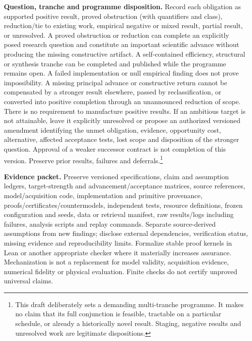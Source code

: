 \documentclass[11pt,letterpaper]{article}
\begin{document}
\textbf{Question, tranche and programme disposition.} Record each obligation as supported positive result, proved obstruction (with quantifiers and class), reduction/tie to existing work, empirical negative or mixed result, partial result, or unresolved. A proved obstruction or reduction can complete an explicitly posed research question and constitute an important scientific advance without producing the missing constructive artifact. A self-contained efficiency, structural or synthesis tranche can be completed and published while the programme remains open. A failed implementation or null empirical finding does not prove impossibility. A missing principal advance or constructive return cannot be compensated by a stronger result elsewhere, passed by reclassification, or converted into positive completion through an unannounced reduction of scope. There is no requirement to manufacture positive results. If an ambitious target is not attainable, leave it explicitly unresolved or propose an authorized versioned amendment identifying the unmet obligation, evidence, opportunity cost, alternative, affected acceptance tests, lost scope and disposition of the stronger question. Approval of a weaker successor contract is not completion of this version. Preserve prior results, failures and deferrals.\footnote{This draft deliberately sets a demanding multi-tranche programme. It makes no claim that its full conjunction is feasible, tractable on a particular schedule, or already a historically novel result. Staging, negative results and unresolved work are legitimate dispositions.}

\textbf{Evidence packet.} Preserve versioned specifications, claim and assumption ledgers, target-strength and advancement/acceptance matrices, source references, model/acquisition code, implementation and primitive provenance, proofs/certificates/countermodels, independent tests, resource definitions, frozen configuration and seeds, data or retrieval manifest, raw results/logs including failures, analysis scripts and replay commands. Separate source-derived assumptions from new findings; disclose external dependencies, verification status, missing evidence and reproducibility limits. Formalize stable proof kernels in Lean or another appropriate checker where it materially increases assurance. Mechanization is not a replacement for model validity, acquisition evidence, numerical fidelity or physical evaluation. Finite checks do not certify unproved universal claims.

\appendix
\end{document}
